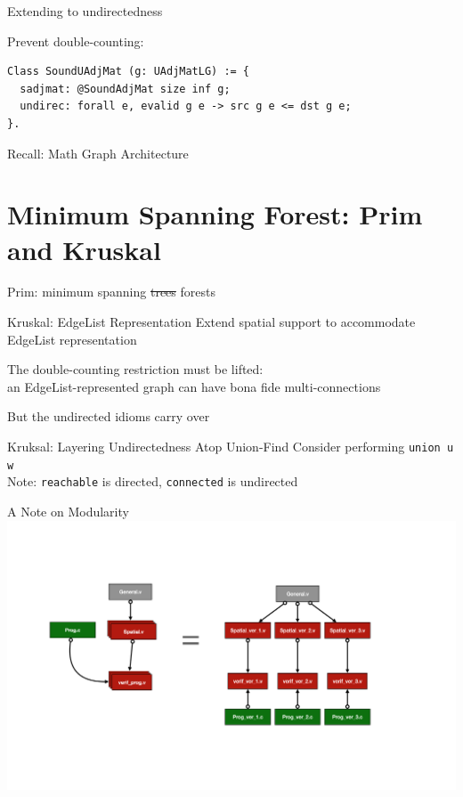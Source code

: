 \documentclass[usenames, xcolor=dvipsnames]{beamer}
\begin{document}
\begin{frame}[fragile]{Extending to undirectedness}

Prevent double-counting:
\begin{Verbatim}
Class SoundUAdjMat (g: UAdjMatLG) := {
  sadjmat: @SoundAdjMat size inf g;
  undirec: forall e, evalid g e -> src g e <= dst g e;
}.
\end{Verbatim}
\end{frame}

\begin{frame}{Recall: Math Graph Architecture}
  \centering
  \colorbox{lightg}{}
\end{frame}

\section{Minimum Spanning Forest: Prim and Kruskal}

\begin{frame}{Prim: minimum spanning \sout{trees} forests}
\end{frame}

\begin{frame}{Kruskal: EdgeList Representation}
Extend spatial support to accommodate EdgeList representation

\bigskip

The double-counting restriction must be lifted: \\
\hspace{1em}an EdgeList-represented graph can have bona fide multi-connections

\bigskip

But the undirected idioms carry over
\end{frame}

\begin{frame}{Kruksal: Layering Undirectedness Atop Union-Find}
  Consider performing \texttt{union u w} \\
  Note: \texttt{reachable} is directed, \texttt{connected} is undirected \\
  \vspace{2em}
  \centering
  
\end{frame}

\begin{frame}{A Note on Modularity}
\centering
  \includegraphics[scale=0.33]{key}
\end{frame}
\end{document}
